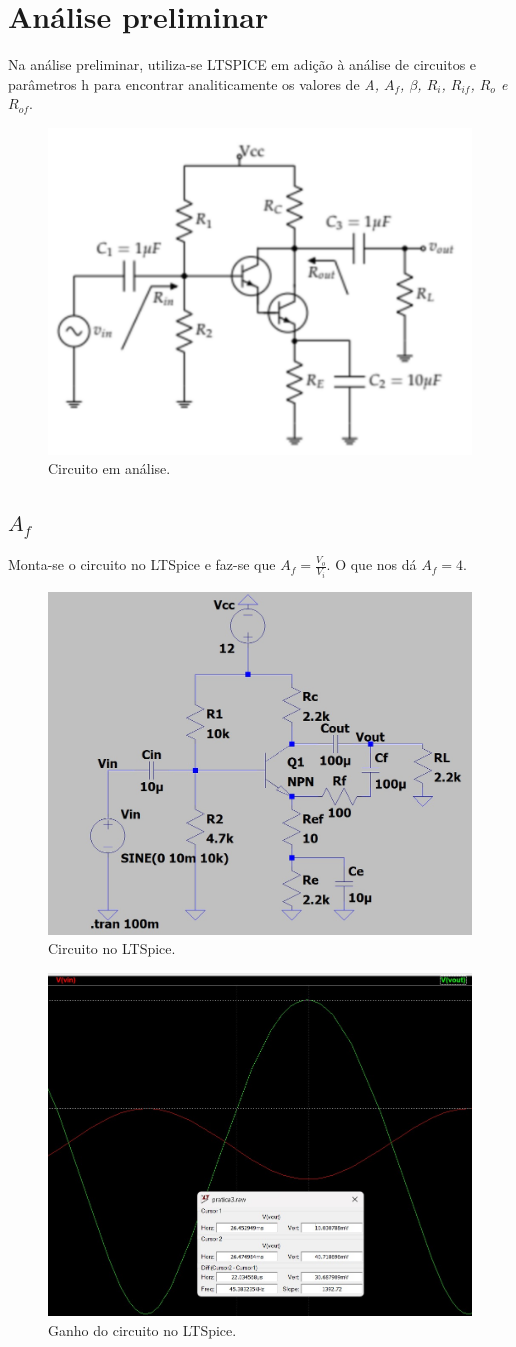 \section{Análise preliminar}

Na análise preliminar, utiliza-se LTSPICE em adição à análise de circuitos e parâmetros h para encontrar analiticamente os valores de \emph{A, $A_f$, $\beta$, $R_i$, $R_{if}$, $R_o$ e $R_{o f}$}.

\begin{figure}[h]
    \centering
    \includegraphics[width=0.5\columnwidth]{Images/o_circuito.png}
    \caption{Circuito em análise.}
\end{figure}

\subsection{$A_f$}

Monta-se o circuito no LTSpice e faz-se que $A_f = \frac{V_o}{V_i}$. O que nos dá $A_f = 4$.

\begin{figure}[h]
    \centering
    \includegraphics[width=0.5\columnwidth]{Images/circuito_ltspice.jpeg}
    \caption{Circuito no LTSpice.}
\end{figure}

\begin{figure}[h]
    \centering
    \includegraphics[width=0.5\columnwidth]{Images/circuito_ltspice_ganho.jpeg}
    \caption{Ganho do circuito no LTSpice.}
\end{figure}

